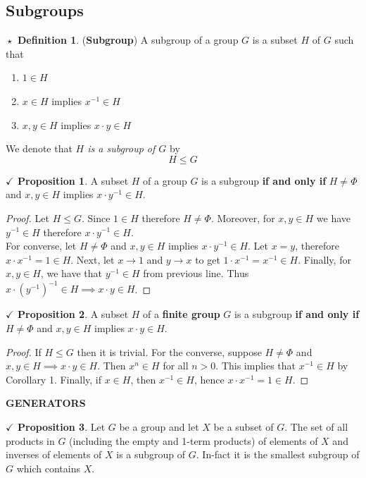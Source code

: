 \documentclass{article}
\theoremstyle{definition}
\newtheorem{definition}{$\boxed{\star}$ Definition}
\theoremstyle{remark}
\theoremstyle{definition}
\theoremstyle{definition}
\newtheorem{proposition}{$\checkmark$ Proposition}
\theoremstyle{definition}
\theoremstyle{proof}
\newcommand{\inv}[1]{#1^{-1}}
\begin{document}
\subsection{Subgroups}
\begin{definition}
	(\textbf{Subgroup}) A subgroup of a group $ G $ is a subset $ H $ of $ G $ such that 
	\begin{enumerate}
		\item{$ 1 \in H $}
		\item{$ x\in H $ implies $ \inv{x} \in H $}
		\item{$ x,y \in H $ implies $ x\cdot y \in H $}
	\end{enumerate}
We denote that\emph{ $ H $ is a subgroup of $ G $} by
\[H \le G\]
\end{definition}
\hrulefill
\begin{proposition}
	A subset $ H $ of a group  $ G $ is a subgroup \textbf{if and only if} $ H \neq \Phi $ and $ x,y \in H $ implies $ x\cdot \inv{y} \in H $.
\end{proposition}
\begin{proof}
	Let $ H \le G $. Since $ 1\in H $ therefore $ H\neq \Phi $. Moreover, for $x, y \in H $ we have $ \inv{y} \in H $ therefore $ x\cdot \inv{y} \in H $.\\
	For converse, let $ H\neq \Phi $ and $ x,y \in H $ implies $ x\cdot \inv{y} \in H$. Let $ x = y $, therefore $ x\cdot \inv{x} = 1 \in H $. Next, let $ x\to 1 $ and $ y \to x $ to get $ 1 \cdot \inv{x} = \inv{x} \in H$. Finally, for $ x,y \in H $, we have that $ \inv{y} \in H$ from previous line. Thus $ x\cdot\inv{(\inv{y})} \in H \implies x\cdot y \in  H$.
\end{proof}
\hrulefill
\begin{proposition}
	A subset $ H $ of a \textbf{finite group} $ G $ is a subgroup \textbf{if and only if} $ H \neq \Phi $ and $ x,y\in H $ implies $ x\cdot y \in H $.
\end{proposition}
\begin{proof}
	If $ H \le G $ then it is trivial. For the converse, suppose $ H\neq \Phi $ and $ x,y \in H \implies x\cdot y \in H  $. Then $ x^n \in H $ for all $ n>0$. This implies that $ \inv{x} \in H $ by Corollary 1. Finally, if $ x\in H $, then $ \inv{x}\in H $, hence $ x\cdot \inv{x} = 1 \in H $.
\end{proof}
\hrulefill
\textbf{GENERATORS}
\hrulefill
\begin{proposition}
	Let $ G $ be a group and let $ X $ be a subset of $ G $. The set of all products in $ G $ (including the empty and 1-term products) of elements of $ X $ and inverses of elements of $ X $ is a subgroup of $ G $. In-fact it is the smallest subgroup of $ G $ which contains $ X $.
\end{proposition}
\end{document}
